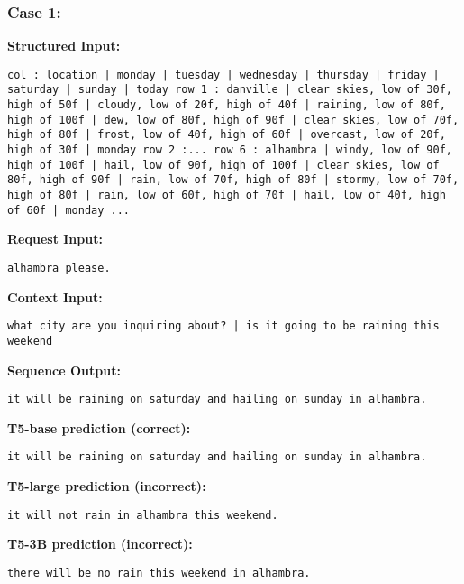 \documentclass[11pt]{article}
\begin{document}
\subsubsection{Case 1:}
\label{app:kvret_case1}
\textbf{Structured Input:} 
\begin{lstlisting}
col : location | monday | tuesday | wednesday | thursday | friday | saturday | sunday | today row 1 : danville | clear skies, low of 30f, high of 50f | cloudy, low of 20f, high of 40f | raining, low of 80f, high of 100f | dew, low of 80f, high of 90f | clear skies, low of 70f, high of 80f | frost, low of 40f, high of 60f | overcast, low of 20f, high of 30f | monday row 2 :... row 6 : alhambra | windy, low of 90f, high of 100f | hail, low of 90f, high of 100f | clear skies, low of 80f, high of 90f | rain, low of 70f, high of 80f | stormy, low of 70f, high of 80f | rain, low of 60f, high of 70f | hail, low of 40f, high of 60f | monday ...
\end{lstlisting}
\textbf{Request Input:} 
\begin{lstlisting}
alhambra please. 
\end{lstlisting}
\textbf{Context Input:} 
\begin{lstlisting}
what city are you inquiring about? | is it going to be raining this weekend
\end{lstlisting}
\textbf{Sequence Output:} 
\begin{lstlisting}
it will be raining on saturday and hailing on sunday in alhambra.
\end{lstlisting}
\textbf{T5-base prediction (correct):} 
\begin{lstlisting}
it will be raining on saturday and hailing on sunday in alhambra.
\end{lstlisting}
\textbf{T5-large prediction (incorrect):} 
\begin{lstlisting}
it will not rain in alhambra this weekend.
\end{lstlisting}
\textbf{T5-3B prediction (incorrect):} 
\begin{lstlisting}
there will be no rain this weekend in alhambra.
\end{lstlisting}
\end{document}
